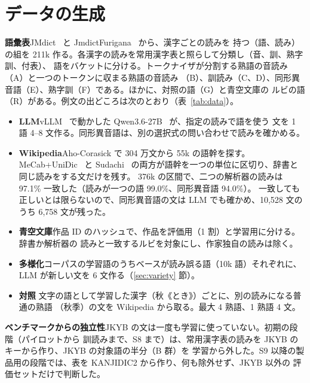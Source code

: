 \documentclass[10pt,a4paper,twocolumn]{article}
\begin{document}
\section{データの生成}\label{sec:data}
\textbf{語彙表}\quad JMdict~\cite{jmdict} と JmdictFurigana~\cite{jmdictfurigana} から、漢字ごとの読みを
持つ（語、読み）の組を 211k 作る。各漢字の読みを常用漢字表と照らして分類し（音、訓、熟字訓、付表）、
語をバケットに分ける。トークナイザが分割する熟語の音読み（A）と一つのトークンに収まる熟語の音読み
（B）、訓読み（C、D）、同形異音語（E）、熟字訓（F）である。ほかに、対照の語（G）と青空文庫の
ルビの語（R）がある。例文の出どころは次のとおり（表~\ref{tab:data}）。
\begin{itemize}
\item \textbf{LLM}\quad vLLM~\cite{vllm} で動かした Qwen3.6-27B~\cite{qwen3} が、指定の読みで語を使う
  文を 1 語 4--8 文作る。同形異音語は、別の選択式の問い合わせで読みを確かめる。
\item \textbf{Wikipedia}\quad Aho-Corasick で 304 万文から 55k の語幹を探す。MeCab+UniDic~\cite{mecab,unidic}
  と Sudachi~\cite{sudachi} の両方が語幹を一つの単位に区切り、辞書と同じ読みをする文だけを残す。
  376k の区間で、二つの解析器の読みは 97.1\% 一致した（読みが一つの語 99.0\%、同形異音語 94.0\%）。
  一致しても正しいとは限らないので、同形異音語の文は LLM でも確かめ、10,528 文のうち 6,758 文が残った。
\item \textbf{青空文庫}\quad 作品 ID のハッシュで、作品を評価用（1 割）と学習用に分ける。辞書か解析器の
  読みと一致するルビを対象にし、作家独自の読みは除く。
\item \textbf{多様化}\quad コーパスの学習語のうちベースが読み誤る語（10k 語）それぞれに、LLM が新しい文を
  6 文作る（\ref{sec:variety} 節）。
\item \textbf{対照} 文字の語として学習した漢字（秋《とき》）ごとに、別の読みになる普通の熟語
  （秋季）の文を Wikipedia から取る。最大 4 熟語、1 熟語 4 文。
\end{itemize}

\textbf{ベンチマークからの独立性}\quad JKYB の文は一度も学習に使っていない。初期の段階（パイロットから
訓読みまで、S8 まで）は、常用漢字表の読みを JKYB のキーから作り、JKYB の対象語の半分（B 群）を
学習から外した。S9 以降の製品用の段階では、表を KANJIDIC2 から作り、何も除外せず、JKYB 以外の
評価セットだけで判断した。
\end{document}
